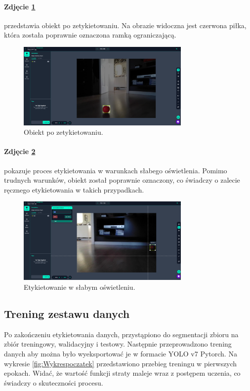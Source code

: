 \documentclass[a4paper,twoside,12pt]{book}
\begin{document}
\newpage
\paragraph{Zdjęcie \ref{fig:labeling2}}
przedstawia obiekt po zetykietowaniu. Na obrazie widoczna jest czerwona piłka, która została poprawnie oznaczona ramką ograniczającą.

\begin{figure}[h]
    \centering
    \includegraphics[width=0.75\textwidth]{Images/Roboflow/labeling2.png}
    \caption{Obiekt po zetykietowaniu.}
    \label{fig:labeling2}
\end{figure}

\paragraph{Zdjęcie \ref{fig:labeling3}}
pokazuje proces etykietowania w warunkach słabego oświetlenia. Pomimo trudnych warunków, obiekt został poprawnie oznaczony, co świadczy o zalecie ręcznego etykietowania w takich przypadkach.

\begin{figure}[h]
    \centering
    \includegraphics[width=0.75\textwidth]{Images/Roboflow/labeling3.png}
    \caption{Etykietowanie w słabym oświetleniu.}
    \label{fig:labeling3}
\end{figure}

\newpage

\subsection{Trening zestawu danych}
Po zakończeniu etykietowania danych, przystąpiono do segmentacji zbioru na zbiór treningowy, walidacyjny i testowy.
Następnie przeprowadzono trening danych aby można było wyeksportować je w formacie YOLO v7 Pytorch.
Na wykresie \ref{fig:Wykrespoczatek} przedstawiono przebieg treningu w pierwszych epokach. Widać, że wartość funkcji straty maleje wraz z postępem uczenia, co świadczy o skuteczności procesu.
\end{document}
